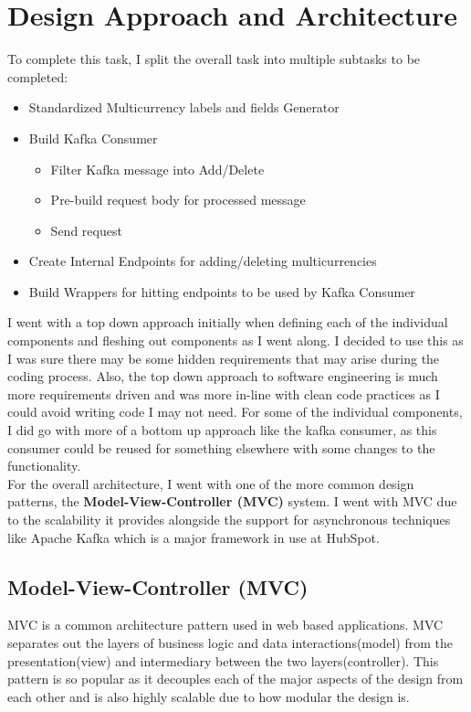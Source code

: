 \section{Design Approach and Architecture}
To complete this task, I split the overall task into multiple subtasks to be completed:
\begin{itemize}
\item Standardized Multicurrency labels and fields Generator
\item Build Kafka Consumer
\begin{itemize}
\item Filter Kafka message into Add/Delete
\item Pre-build request body for processed message
\item Send request
\end{itemize}
\item Create Internal Endpoints for adding/deleting multicurrencies
\item Build Wrappers for hitting endpoints to be used by Kafka Consumer
\end{itemize}

I went with a top down approach initially when defining each of the individual components and fleshing out components as I went along. I decided to use this as I was sure there may be some hidden requirements that may arise during the coding process. Also, the top down approach to software engineering is much more requirements driven and was more in-line with clean code practices as I could avoid writing code I may not need. For some of the individual components, I did go with more of a bottom up approach like the kafka consumer, as this consumer could be reused for something elsewhere with some changes to the functionality. \newline \\ For the overall architecture, I went with one of the more common design patterns, the \textbf{Model-View-Controller (MVC)} system. I went with MVC due to the scalability it provides alongside the support for asynchronous techniques like Apache Kafka which is a major framework in use at HubSpot.

\subsection{Model-View-Controller (MVC)}
MVC is a common architecture pattern used in web based applications. MVC separates out the layers of business logic and data interactions(model) from the presentation(view) and intermediary between the two layers(controller). This pattern is so popular as it decouples each of the major aspects of the design from each other and is also highly scalable due to how modular the design is.


